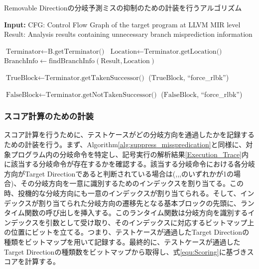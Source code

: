 \begin{algorithm}
\caption{Removable Directionの分岐予測ミスの抑制のための計装を行うアルゴリズム}
\label{alg:suppress_misspredication}
\begin{algorithmic}[H]

\State \textbf{Input:}
\State \hspace{1em} CFG: Control Flow Graph of the target program at LLVM MIR level
\State \hspace{1em} Result: Analysis results containing unnecessary branch misprediction information

        \State $\text{Terminator} \gets \text{B.getTerminator()}$
            \State $\text{Location} \gets \text{Terminator.getLocation()}$
            \State $\text{BranchInfo} \gets \text{findBranchInfo}(\text{Result}, \text{Location})$

                    \State $\text{TrueBlock} \gets \text{Terminator.getTakenSuccessor()}$
                    \State {}($\text{TrueBlock}$, ``force\_rlbk'')
                \EndIf

                    \State $\text{FalseBlock} \gets \text{Terminator.getNotTakenSuccessor()}$
                    \State {}($\text{FalseBlock}$, ``force\_rlbk'')
                \EndIf
            \EndIf
        \EndIf
    \EndFor
\EndFunction

\end{algorithmic}
\end{algorithm}


\subsubsection{スコア計算のための計装}
スコア計算を行うために、テストケースがどの分岐方向を通過したかを記録するための計装を行う。まず、Algorithm\ref{alg:suppress_misspredication}と同様に、対象プログラム内の分岐命令を特定し、記号実行の解析結果\ref{Execution_Trace}内に該当する分岐命令が存在するかを確認する。該当する分岐命令における各分岐方向がTarget Directionであると判断されている場合は(,,,のいずれかが1の場合)、その分岐方向を一意に識別するためのインデックスを割り当てる。この時、投機的な分岐方向にも一意のインデックスが割り当てられる。そして、インデックスが割り当てられた分岐方向の遷移先となる基本ブロックの先頭に、ランタイム関数の呼び出しを挿入する。このランタイム関数は分岐方向を識別するインデックスを引数として受け取り、そのインデックスに対応するビットマップ上の位置にビットを立てる。つまり、テストケースが通過したTarget Directionの種類をビットマップを用いて記録する。最終的に、テストケースが通過したTarget Directionの種類数をビットマップから取得し、式\ref{equ:Scoring}に基づきスコアを計算する。\par

